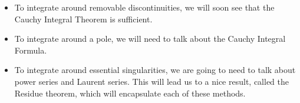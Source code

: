 \begin{itemize} \item To integrate around removable discontinuities, we will soon see that the Cauchy Integral Theorem is sufficient.
\item To integrate around a pole, we will need to talk about the Cauchy Integral Formula.
\item To integrate around essential singularities, we are going to need to talk about power series and Laurent series. This will lead us to a nice result, called the Residue theorem, which will encapsulate each of these methods.
\end{itemize}

%
%
%
%
%
%
%
%
%
%
%

